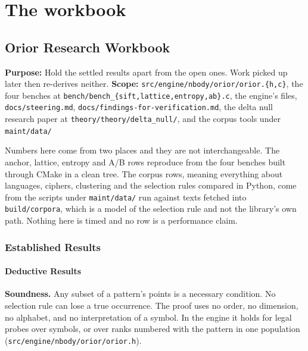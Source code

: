 \chapter{The workbook}

\section{Orior Research Workbook}

\textbf{Purpose:} Hold the settled results apart from the open ones. Work picked up later then re-derives neither. \textbf{Scope:} \texttt{src/\allowbreak{}engine/\allowbreak{}nbody/\allowbreak{}orior/\allowbreak{}orior.\{h,c\}}, the four benches at \texttt{bench/\allowbreak{}bench\_\{sift,lattice,entropy,ab\}.c}, the engine's files, \texttt{docs/\allowbreak{}steering.md}, \texttt{docs/\allowbreak{}findings-\allowbreak{}for-\allowbreak{}verification.md}, the delta null research paper at \texttt{theory/\allowbreak{}theory/\allowbreak{}delta\_null/}, and the corpus tools under \texttt{maint/\allowbreak{}data/\allowbreak{}}

Numbers here come from two places and they are not interchangeable. The anchor, lattice, entropy and A/B rows reproduce from the four benches built through CMake in a clean tree. The corpus rows, meaning everything about languages, ciphers, clustering and the selection rules compared in Python, come from the scripts under \texttt{maint/\allowbreak{}data/\allowbreak{}} run against texts fetched into \texttt{build/\allowbreak{}corpora}, which is a model of the selection rule and not the library's own path. Nothing here is timed and no row is a performance claim.

\subsection{Established Results}

\subsubsection{Deductive Results}

\textbf{Soundness.} Any subset of a pattern's points is a necessary condition. No selection rule can lose a true occurrence. The proof uses no order, no dimension, no alphabet, and no interpretation of a symbol. In the engine it holds for legal probes over symbols, or over ranks numbered with the pattern in one population (\texttt{src/\allowbreak{}engine/\allowbreak{}nbody/\allowbreak{}orior/\allowbreak{}orior.h}).

